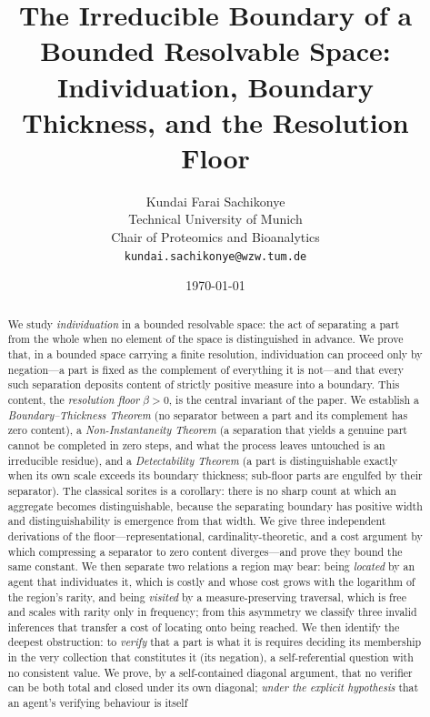 \documentclass[11pt,a4paper]{article}
\title{\textbf{The Irreducible Boundary of a Bounded Resolvable Space:\\[2pt]
Individuation, Boundary Thickness, and the Resolution Floor}}
\author{%
Kundai Farai Sachikonye\\
\small Technical University of Munich\\
\small Chair of Proteomics and Bioanalytics\\
\small \texttt{kundai.sachikonye@wzw.tum.de}}
\date{\today}
\theoremstyle{thmstyle}
\theoremstyle{definition}
\theoremstyle{remark}
\newcommand{\thick}{\beta}
\begin{document}
\maketitle

\begin{abstract}
\noindent
We study \emph{individuation} in a bounded resolvable space: the act of
separating a part from the whole when no element of the space is
distinguished in advance. We prove that, in a bounded space carrying a
finite resolution, individuation can proceed only by negation---a part is
fixed as the complement of everything it is not---and that every such
separation deposits content of strictly positive measure into a boundary.
This content, the \emph{resolution floor} $\thick>0$, is the central
invariant of the paper. We establish a \emph{Boundary--Thickness Theorem}
(no separator between a part and its complement has zero content), a
\emph{Non-Instantaneity Theorem} (a separation that yields a genuine part
cannot be completed in zero steps, and what the process leaves untouched is
an irreducible residue), and a \emph{Detectability Theorem} (a part is
distinguishable exactly when its own scale exceeds its boundary thickness;
sub-floor parts are engulfed by their separator). The classical sorites is a
corollary: there is no sharp count at which an aggregate becomes
distinguishable, because the separating boundary has positive width and
distinguishability is emergence from that width. We give three independent
derivations of the floor---representational, cardinality-theoretic, and a
cost argument by which compressing a separator to zero content diverges---and
prove they bound the same constant. We then separate two relations a region may
bear: being \emph{located} by an agent that individuates it, which is costly and
whose cost grows with the logarithm of the region's rarity, and being
\emph{visited} by a measure-preserving traversal, which is free and scales with
rarity only in frequency; from this asymmetry we classify three invalid
inferences that transfer a cost of locating onto being reached. We then identify
the deepest obstruction:
to \emph{verify} that a part is what it is requires deciding its membership
in the very collection that constitutes it (its negation), a self-referential
question with no consistent value. We prove, by a self-contained diagonal
argument, that no verifier can be both total and closed under its own diagonal;
\emph{under the explicit hypothesis} that an agent's verifying behaviour is itself

\end{abstract}
\end{document}
